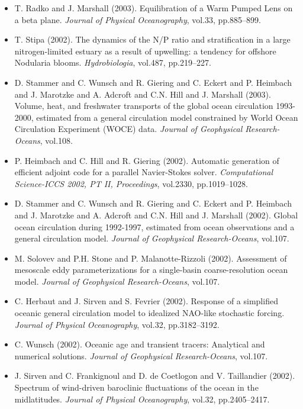 \begin{itemize}
\item T. Radko and J. Marshall (2003). Equilibration of a Warm Pumped Lens
on a beta plane. {\it Journal of Physical Oceanography}, vol.33, pp.885--899. 

\item T. Stipa (2002). The dynamics of the N/P ratio and stratification in
a large nitrogen-limited estuary as a result of upwelling: a tendency
for offshore Nodularia blooms. {\it Hydrobiologia}, vol.487, pp.219--227. 

\item D. Stammer and C. Wunsch and R. Giering and C. Eckert and P.
Heimbach and J. Marotzke and A. Adcroft and C.N. Hill and J. Marshall
(2003). Volume, heat, and freshwater transports of the global ocean
circulation 1993-2000, estimated from a general circulation model
constrained by World Ocean Circulation Experiment (WOCE) data. {\it Journal
of Geophysical Research-Oceans}, vol.108. 

\item P. Heimbach and C. Hill and R. Giering (2002). Automatic generation
of efficient adjoint code for a parallel Navier-Stokes solver.
{\it Computational Science-ICCS 2002, PT II, Proceedings}, vol.2330,
pp.1019--1028. 

\item D. Stammer and C. Wunsch and R. Giering and C. Eckert and P.
Heimbach and J. Marotzke and A. Adcroft and C.N. Hill and J. Marshall
(2002). Global ocean circulation during 1992-1997, estimated from ocean
observations and a general circulation model. {\it Journal of Geophysical
Research-Oceans}, vol.107. 

\item M. Solovev and P.H. Stone and P. Malanotte-Rizzoli (2002).
Assessment of mesoscale eddy parameterizations for a single-basin
coarse-resolution ocean model. {\it Journal of Geophysical Research-Oceans},
vol.107. 

\item C. Herbaut and J. Sirven and S. Fevrier (2002). Response of a
simplified oceanic general circulation model to idealized NAO-like
stochastic forcing. {\it Journal of Physical Oceanography}, vol.32,
pp.3182--3192. 

\item C. Wunsch (2002). Oceanic age and transient tracers: Analytical and
numerical solutions. {\it Journal of Geophysical Research-Oceans}, vol.107. 

\item J. Sirven and C. Frankignoul and D. de Coetlogon and V. Taillandier
(2002). Spectrum of wind-driven baroclinic fluctuations of the ocean in
the midlatitudes. {\it Journal of Physical Oceanography}, vol.32,
pp.2405--2417. 


\end{itemize}
